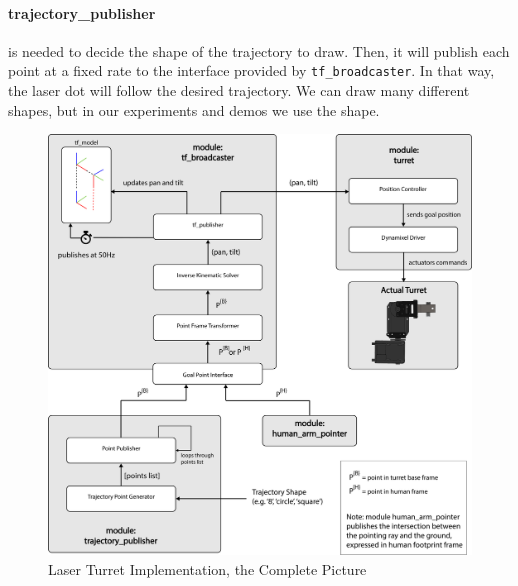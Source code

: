 \paragraph{trajectory\_publisher} is needed to decide the shape of the trajectory to draw. Then, it will publish each point at a fixed rate to the interface provided by \texttt{tf\_broadcaster}. In that way, the laser dot will follow the desired trajectory. We can draw many different shapes, but in our experiments and demos we use the \virgolette{$\infty$} shape.

\begin{figure}
	\centering
	\includegraphics[width=\textwidth]{img/turretPipeline.png}%
	\caption{Laser Turret Implementation, the Complete Picture}
	\label{fig:turretPipeline}
\end{figure}


